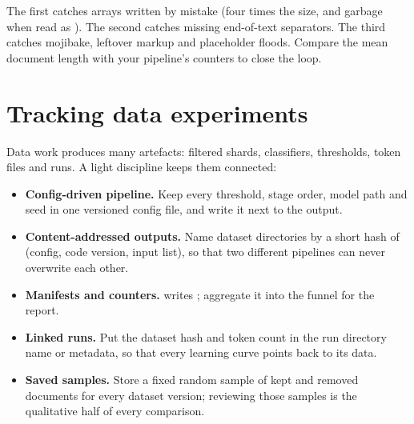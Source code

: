 \noindent The first catches  arrays written by mistake (four times the size, and garbage
when read as ). The second catches missing end-of-text separators. The third catches
mojibake, leftover markup and placeholder floods. Compare the mean document length with your
pipeline's counters to close the loop.

\section{Tracking data experiments}\label{sec:proj4:tracking}

Data work produces many artefacts: filtered shards, classifiers, thresholds, token files and runs. A light
discipline keeps them connected:

\begin{itemize}
  \item \textbf{Config-driven pipeline.} Keep every threshold, stage order, model path and seed in one
        versioned config file, and write it next to the output.
  \item \textbf{Content-addressed outputs.} Name dataset directories by a short hash of (config,
        code version, input list), so that two different pipelines can never overwrite each other.
  \item \textbf{Manifests and counters.}  writes ; aggregate
        it into the funnel for the report.
  \item \textbf{Linked runs.} Put the dataset hash and token count in the run directory name or
        metadata, so that every learning curve points back to its data.
  \item \textbf{Saved samples.} Store a fixed random sample of kept and removed documents for every
        dataset version; reviewing those samples is the qualitative half of every comparison.
\end{itemize}

